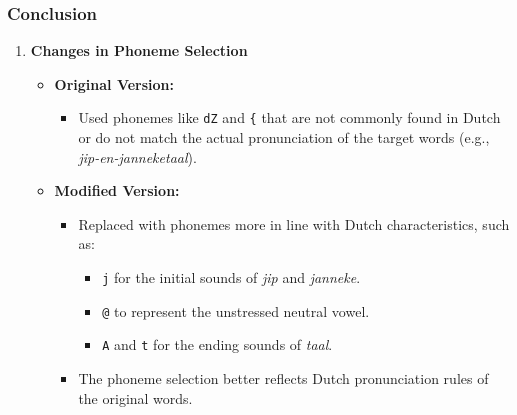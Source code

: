 \documentclass{../labbook}
\begin{document}
\begin{solution}
\subsubsection*{Conclusion}
\begin{enumerate}
    \item \textbf{Changes in Phoneme Selection}
    \begin{itemize}
        \item \textbf{Original Version:}
        \begin{itemize}
            \item Used phonemes like \texttt{dZ} and \texttt{\{} that are not commonly found in Dutch or do not match the actual pronunciation of the target words (e.g., \textit{jip-en-janneketaal}).
        \end{itemize}
        \item \textbf{Modified Version:}
        \begin{itemize}
            \item Replaced with phonemes more in line with Dutch characteristics, such as:
            \begin{itemize}
                \item \texttt{j} for the initial sounds of \textit{jip} and \textit{janneke}.
                \item \texttt{@} to represent the unstressed neutral vowel.
                \item \texttt{A} and \texttt{t} for the ending sounds of \textit{taal}.
            \end{itemize}
            \item The phoneme selection better reflects Dutch pronunciation rules of the original words.
        \end{itemize}
    \end{itemize}


\end{enumerate}
\end{solution}
\end{document}
